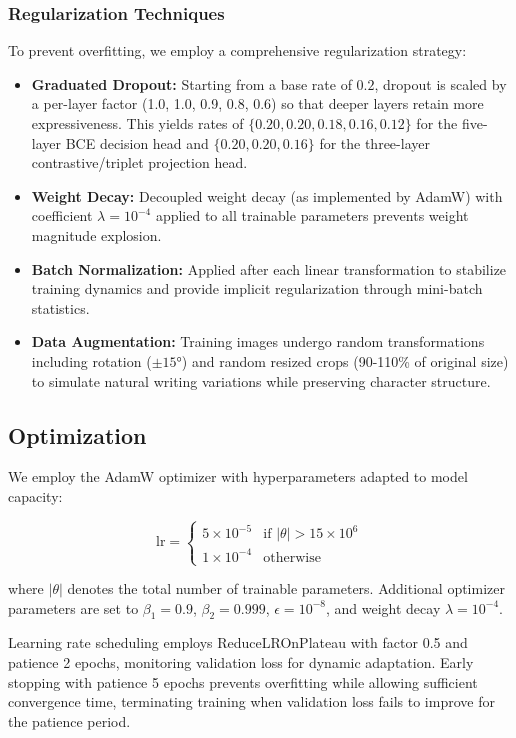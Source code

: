 \subsubsection{Regularization Techniques}

To prevent overfitting, we employ a comprehensive regularization strategy:

\begin{itemize}
\item \textbf{Graduated Dropout:} Starting from a base rate of $0.2$, dropout is scaled by a per-layer factor (1.0, 1.0, 0.9, 0.8, 0.6) so that deeper layers retain more expressiveness. This yields rates of $\{0.20,0.20,0.18,0.16,0.12\}$ for the five-layer BCE decision head and $\{0.20,0.20,0.16\}$ for the three-layer contrastive/triplet projection head.
\item \textbf{Weight Decay:} Decoupled weight decay (as implemented by AdamW) with coefficient $\lambda = 10^{-4}$ applied to all trainable parameters prevents weight magnitude explosion.
\item \textbf{Batch Normalization:} Applied after each linear transformation to stabilize training dynamics and provide implicit regularization through mini-batch statistics.

\item \textbf{Data Augmentation:} Training images undergo random transformations including rotation ($\pm15°$) and random resized crops (90-110\% of original size) to simulate natural writing variations while preserving character structure.
\end{itemize}

\subsection{Optimization}

We employ the AdamW\cite{loshchilov2019adamw} optimizer with hyperparameters adapted to model capacity:

\begin{equation}
\text{lr} = \begin{cases}
5 \times 10^{-5} & \text{if } |\theta| > 15 \times 10^6 \\
1 \times 10^{-4} & \text{otherwise}
\end{cases}
\end{equation}

where $|\theta|$ denotes the total number of trainable parameters. Additional optimizer parameters are set to $\beta_1 = 0.9$, $\beta_2 = 0.999$, $\epsilon = 10^{-8}$, and weight decay $\lambda = 10^{-4}$.

Learning rate scheduling employs ReduceLROnPlateau with factor 0.5 and patience 2 epochs, monitoring validation loss for dynamic adaptation. Early stopping with patience 5 epochs prevents overfitting while allowing sufficient convergence time, terminating training when validation loss fails to improve for the patience period.